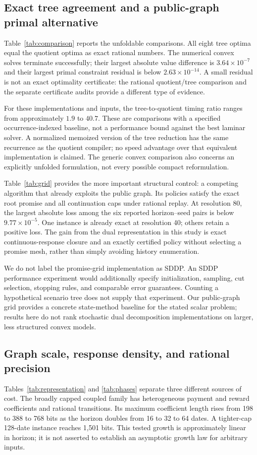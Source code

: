 \subsection{Exact tree agreement and a public-graph primal alternative}
Table~\ref{tab:comparison} reports the unfoldable comparisons. All eight tree optima equal the quotient optima as exact rational numbers. The numerical convex solves terminate successfully; their largest absolute value difference is $3.64\times10^{-7}$ and their largest primal constraint residual is below $2.63\times10^{-14}$. A small residual is not an exact optimality certificate: the rational quotient/tree comparison and the separate certificate audits provide a different type of evidence.

For these implementations and inputs, the tree-to-quotient timing ratio ranges from approximately $1.9$ to $40.7$. These are comparisons with a specified occurrence-indexed baseline, not a performance bound against the best laminar solver. A normalized memoized version of the tree reduction has the same recurrence as the quotient compiler; no speed advantage over that equivalent implementation is claimed. The generic convex comparison also concerns an explicitly unfolded formulation, not every possible compact reformulation.

Table~\ref{tab:grid} provides the more important structural control: a competing algorithm that already exploits the public graph. Its policies satisfy the exact root promise and all continuation caps under rational replay. At resolution 80, the largest absolute loss among the six reported horizon--seed pairs is below $9.77\times10^{-5}$. One instance is already exact at resolution 40; others retain a positive loss. The gain from the dual representation in this study is exact continuous-response closure and an exactly certified policy without selecting a promise mesh, rather than simply avoiding history enumeration.

We do not label the promise-grid implementation as SDDP. An SDDP performance experiment would additionally specify initialization, sampling, cut selection, stopping rules, and comparable error guarantees. Counting a hypothetical scenario tree does not supply that experiment. Our public-graph grid provides a concrete state-method baseline for the stated scalar problem; results here do not rank stochastic dual decomposition implementations on larger, less structured convex models.

\subsection{Graph scale, response density, and rational precision}
Tables~\ref{tab:representation} and \ref{tab:phases} separate three different sources of cost. The broadly capped coupled family has heterogeneous payment and reward coefficients and rational transitions. Its maximum coefficient length rises from 198 to 388 to 768 bits as the horizon doubles from 16 to 32 to 64 dates. A tighter-cap 128-date instance reaches 1,501 bits. This tested growth is approximately linear in horizon; it is not asserted to establish an asymptotic growth law for arbitrary inputs.

